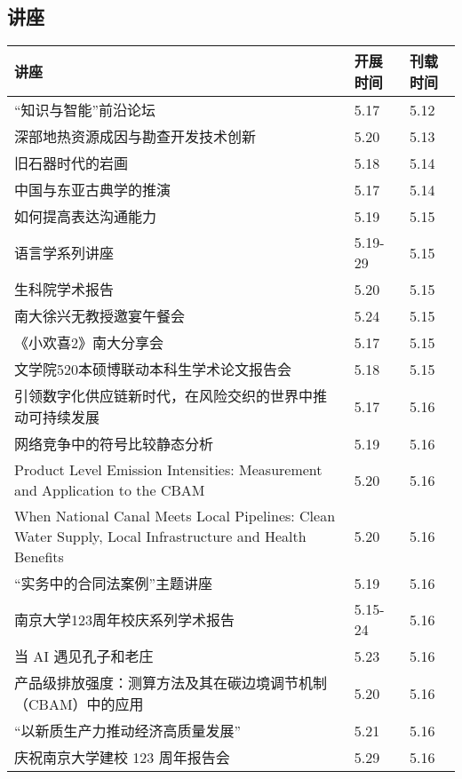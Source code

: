 \documentclass[letterpaper, 12pt]{article}
\begin{document}
\begin{multicols}{2}
\pagebreak

\section{讲座}
\begin{tabular}{|>{\centering\arraybackslash}m{}|m{}|m{}|}
    \hline
    讲座 & 开展时间 & 刊载时间\\
    \hline\hline
    “知识与智能”前沿论坛 & 5.17 & 5.12\\\hline
    深部地热资源成因与勘查开发技术创新 & 5.20 & 5.13\\\hline
    旧石器时代的岩画 & 5.18 & 5.14\\\hline
    中国与东亚古典学的推演 & 5.17 & 5.14\\\hline
    如何提高表达沟通能力 & 5.19 & 5.15\\\hline
    语言学系列讲座 & 5.19-29 & 5.15\\\hline
    生科院学术报告 & 5.20 & 5.15\\\hline
    南大徐兴无教授邀宴午餐会 & 5.24 & 5.15\\\hline
    《小欢喜2》南大分享会 & 5.17 & 5.15\\\hline
    文学院520本硕博联动本科生学术论文报告会 & 5.18 & 5.15\\\hline
    引领数字化供应链新时代，在风险交织的世界中推动可持续发展 & 5.17 & 5.16\\\hline
    网络竞争中的符号比较静态分析 & 5.19 & 5.16\\\hline
    Product  Level Emission Intensities: Measurement and Application to the CBAM & 5.20 & 5.16\\\hline
    When  National Canal Meets Local Pipelines: Clean Water Supply, Local Infrastructure  and Health Benefits & 5.20 & 5.16\\\hline
    “实务中的合同法案例”主题讲座 & 5.19 & 5.16\\\hline
    南京大学123周年校庆系列学术报告 & 5.15-24 & 5.16\\\hline
    当 AI 遇见孔子和老庄 & 5.23 & 5.16\\\hline
    产品级排放强度：测算方法及其在碳边境调节机制（CBAM）中的应用 & 5.20 & 5.16\\\hline
    “以新质生产力推动经济高质量发展” & 5.21 & 5.16\\\hline
     庆祝南京大学建校 123 周年报告会 & 5.29 & 5.16\\\hline
     

\end{tabular}
\end{multicols}
\end{document}
